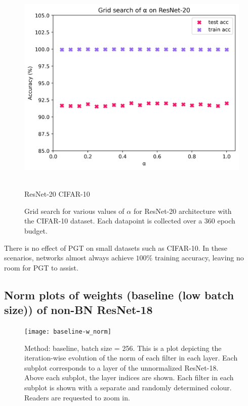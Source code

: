 \documentclass[runningheads]{llncs}
\begin{document}
\begin{figure}[ht]
\centering
\includegraphics[width=0.5\columnwidth]{cifar10_grid_search}
\caption{\\ResNet-20 CIFAR-10}
\caption{ Grid search for various values of $\alpha$ for ResNet-20 architecture with the
CIFAR-10 dataset. Each datapoint is collected over a 360 epoch budget. }
\label{fig:grid_searchc}
\end{figure}


There is no effect of PGT on small datasets such as CIFAR-10. In these scenarios,
networks almost always achieve $100\%$ training accuracy, leaving no room for PGT to
assist.



\clearpage

\subsection{Norm plots of weights (baseline (low batch size)) of non-BN ResNet-18}
\label{sec:plots1}
\begin{figure}[ht] \centering \texttt{[image: baseline-w\_norm]}
\caption{ Method: baseline, batch size = 256. This is a plot depicting the
iteration-wise evolution of the norm of each filter in each layer. Each subplot
corresponds to a layer of the unnormalized ResNet-18. Above each subplot, the layer
indices are shown. Each filter in each subplot is shown with a separate and randomly
determined colour. Readers are requested to zoom in. } \end{figure}

\clearpage
\end{document}
